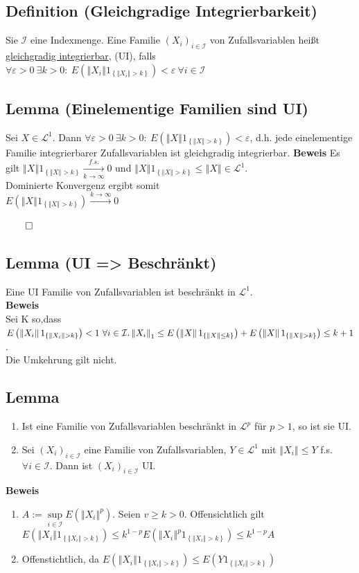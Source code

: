 \documentclass[german,10pt,oneside, fleqn, a4paper]{article}
\newcommand {\N}	{\mathbb{N}}
\newcommand{\brc}[1]{\left(#1\right)}
\newcommand{\brac}[1]{\left\lbrace #1\right\rbrace}
\newcommand{\folge}[3][\N]{\left(#2_#3\right)_{#3\in #1}}
\newcommand{\norm}[1]{\left\Vert #1 \right\Vert}
\newcommand{\QED}{\begin{flushright}$\qed$\end{flushright}}
\newcommand{\mc}[1]{\mathcal{#1}}
\newcommand{\lp}[1]{\mc{L}^{#1}}
\newcommand{\beweis}{\textbf{Beweis}\\}
\newcommand{\1}[1]{1_{#1}}
\newcommand{\2}[1]{\1{\brac{#1}}}
\begin{document}
\subsection{Definition (Gleichgradige Integrierbarkeit)}
Sie $\mc{I}$ eine Indexmenge. Eine Familie $\folge[\mc{I}]{X}{i}$ von Zufallsvariablen heißt \underline{gleichgradig integrierbar}, (UI), falls\\ $\forall\varepsilon>0\ \exists k>0:\ E\brc{\norm{X_i}1_{\brac{\norm{X_i}>k}}}<\varepsilon\ \forall i\in\mc{I}$

\subsection{Lemma (Einelementige Familien sind UI)}
Sei $X\in\mc{L}^1$. Dann $\forall\varepsilon>0\ \exists k>0:\ E\brc{\norm{X}1_{\brac{\norm{X}>k}}}<\varepsilon$, d.h. jede einelementige Familie integrierbarer Zufallsvariablen ist gleichgradig integrierbar.
\textbf{Beweis}
Es gilt $\norm{X}1_{\brac{\norm{X}>k}}\xrightarrow[k\rightarrow\infty]{f.s.}0$ und $\norm{X}1_{\brac{\norm{X}>k}}\leq \norm{X}\in\lp{1}$. \\
Dominierte Konvergenz ergibt somit \\
$E\brc{\norm{X}1_{\brac{\norm{X}>k}}}\xrightarrow{k\rightarrow\infty}0$\QED

\subsection{Lemma (UI => Beschränkt)}
\label{2.13}
Eine UI Familie von Zufallsvariablen ist beschränkt in $\lp{1}$.\\
\beweis
Sei K so,dass $E\brc{\norm{X_i}1_{\brac{\norm{X_i}>k}}}<1\ \forall i\in\mc{I}.\\
\norm{X_i}_1\leq E\brc{\norm{X}1_{\brac{\norm{X}\leq k}}}+E\brc{\norm{X}1_{\brac{\norm{X}>k}}}\leq k+1$.\\
Die Umkehrung gilt nicht.

\subsection{Lemma}
\begin{enumerate}[label=(\alph*)]
\item Ist eine Familie von Zufallsvariablen beschränkt in $\lp{p}$ für $p>1$, so ist sie UI.
\item Sei $\folge[\mc{I}]{X}{i}$ eine Familie von Zufallsvariablen, $Y\in \lp{1}$ mit $\norm{X_i}\leq Y$ f.s. $\forall i \in\mc{I}$. Dann ist $\folge[\mc{I}]{X}{i}$ UI.\\
\end{enumerate}
\beweis
\begin{enumerate}[label=(\alph*)]
\item $A:=\sup\limits_{i\in\mc{I}}E\brc{\norm{X_i}^p}.$ Seien  $v\geq k >0$. Offensichtlich gilt $E\brc{\norm{X_i}1_{\brac{\norm{X_i}>k}}}\leq k^{1-p}E\brc{\norm{X_i}^p1_{\brac{\norm{X_i}>k}}}\leq k^{1-p}A$
\item Offenstichtlich, da $E\brc{\norm{X_i}1_{\brac{\norm{X_i}>k}}}\leq E\brc{Y1_{\brac{\norm{X_i}>k}}}$
\end{enumerate}
\end{document}

